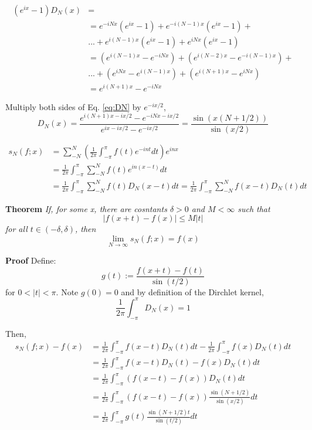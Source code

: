 \documentclass{article}
\begin{document}
\begin{align}
\nonumber
(e^{ix}-1)D_N(x) &=\\
\nonumber
 &=e^{-iNx}(e^{ix}-1)+e^{-i(N-1)x}(e^{ix}-1)+\\
&...+e^{i(N-1)x}(e^{ix}-1)+e^{iNx}(e^{ix}-1)\\
\nonumber
 &=(e^{i(N-1)x}-e^{-iNx})+(e^{i(N-2)x}-e^{-i(N-1)x})+\\
&...+(e^{iNx}-e^{i(N-1)x})+(e^{i(N+1)x}-e^{iNx})\\
\label{eq:D}
&= e^{i(N+1)x}- e^{-iNx}
\end{align}

Multiply both sides of Eq. \ref{eq:DN} by $e^{-ix\slash2}$,
\begin{equation}
D_N(x)= \frac{e^{i(N+1)x-ix\slash2}- e^{-iNx-ix\slash2}}{e^{ix-ix\slash2}-e ^{-ix\slash2}}=\frac{\sin (x(N+1\slash 2))}{\sin(x\slash 2)}
\end{equation}

\begin{align}
s_N(f;x)&=\sum_{-N}^N\left(\frac{1}{2\pi}\int_{-\pi}^\pi f(t)e^{-int}dt\right)e^{inx} \\
&=\frac{1}{2\pi}\int_{-\pi}^\pi\sum_{-N}^N f(t)e^{in(x-t)}dt\\
\label{eq:FT}
&=\frac{1}{2\pi}\int_{-\pi}^\pi\sum_{-N}^N f(t)D_N(x-t)dt=\frac{1}{2\pi}\int_{-\pi}^\pi\sum_{-N}^N f(x-t)D_N(t)dt
\end{align}

\textbf{Theorem} \emph{If, for some x, there are cosntants $\delta>0$ and $ M<\infty$ such that }
\begin{equation} 
\label{eq:bound}
|f(x+t)-f(x)|\leq M|t|
\end{equation}
\emph{for all $t \in (-\delta, \delta)$, then }
\begin{equation}
\lim_{N\rightarrow \infty} s_N(f;x) =f(x)
\end{equation}

\textbf{Proof} Define:
\begin{equation}
g(t):=\frac{f(x+t)-f(t)}{\sin(t\slash2)}
\end{equation}
for $0<|t|<\pi$.  Note $ g(0)=0$ and by definition of the Dirchlet kernel,
\begin{equation}
\frac{1}{2\pi}\int_{-\pi}^\pi D_N(x) =1
\end{equation}

Then,
\begin{align}
s_N(f;x) -f(x)&=\frac{1}{2\pi}\int_{-\pi}^{\pi}f(x-t)D_N(t)dt-\frac{1}{2\pi}\int_{-\pi}^{\pi}f(x)D_N(t)dt\\
&=\frac{1}{2\pi}\int_{-\pi}^{\pi}f(x-t)D_N(t)-f(x)D_N(t)dt\\
&=\frac{1}{2\pi}\int_{-\pi}^{\pi}(f(x-t)-f(x))D_N(t)dt\\
&=\frac{1}{2\pi}\int_{-\pi}^{\pi}(f(x-t)-f(x))\frac{\sin(N+1\slash2)}{\sin(x\slash2)}dt\\
&=\frac{1}{2\pi}\int_{-\pi}^{\pi}g(t)\frac{\sin(N+1\slash2)t}{\sin(t\slash 2)}dt\\
\end{align}
\end{document}
